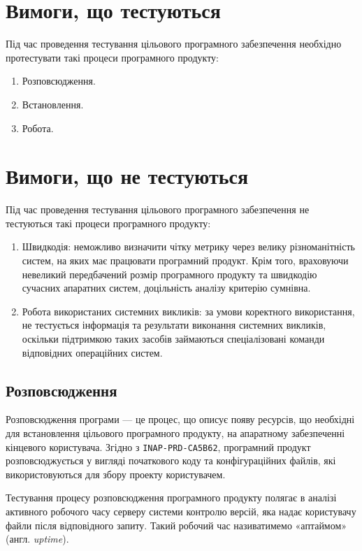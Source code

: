 \documentclass[a4paper,oneside,DIV=12,12pt]{scrartcl}
\begin{document}
    \section{Вимоги, що тестуються}
		Під час проведення тестування цільового програмного забезпечення необхідно протестувати такі процеси програмного продукту:
		\begin{enumerate}
			\item Розповсюдження.
			\item Встановлення.
			\item Робота.
		\end{enumerate}
		
    \section{Вимоги, що не тестуються}
		Під час проведення тестування цільового програмного забезпечення не тестуються такі процеси програмного продукту:
		\begin{enumerate}
			\item Швидкодія: неможливо визначити чітку метрику через велику різноманітність систем, на яких має працювати програмний продукт. Крім того, враховуючи невеликий передбачений розмір програмного продукту та швидкодію сучасних апаратних систем, доцільність аналізу критерію сумнівна.
			\item Робота використаних системних викликів: за умови коректного використання, не тестується інформація та результати виконання системних викликів, оскільки підтримкою таких засобів займаються спеціалізовані команди відповідних операційних систем.
		\end{enumerate}
		
		\subsection{Розповсюдження}
			Розповсюдження програми --- це процес, що описує появу ресурсів, що необхідні для встановлення цільового програмного продукту, на апаратному забезпеченні кінцевого користувача. Згідно з \texttt{INAP-PRD-CA5B62}, програмний продукт розповсюджується у вигляді початкового коду та конфігураційних файлів, які використовуються для збору проекту користувачем.
			
			Тестування процесу розповсюдження програмного продукту полягає в аналізі активного робочого часу серверу системи контролю версій, яка надає користувачу файли після відповідного запиту. Такий робочий час називатимемо «аптаймом» (англ. \emph{uptime}).
			
\end{document}
